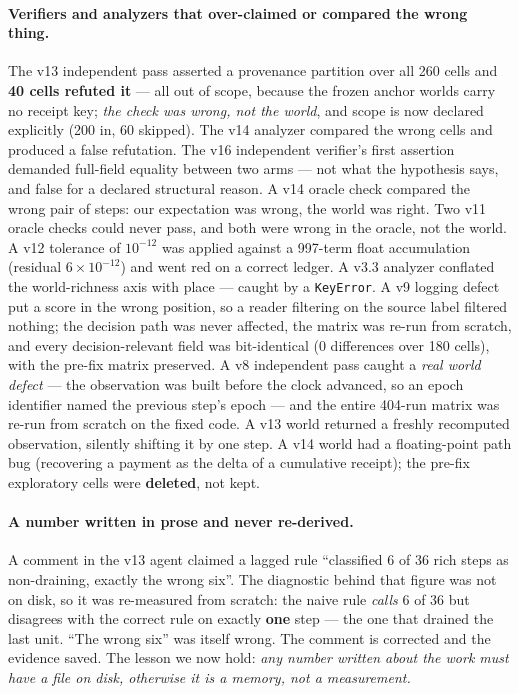 \documentclass[11pt]{article}
\newcommand{\code}[1]{\texttt{\small #1}}
\begin{document}
\paragraph{Verifiers and analyzers that over-claimed or compared the wrong thing.}
The v13 independent pass asserted a provenance partition over all 260 cells and
\textbf{40 cells refuted it} --- all out of scope, because the frozen anchor worlds
carry no receipt key; \emph{the check was wrong, not the world}, and scope is now
declared explicitly (200 in, 60 skipped). The v14 analyzer compared the wrong cells and
produced a false refutation. The v16 independent verifier's first assertion demanded
full-field equality between two arms --- not what the hypothesis says, and false for a
declared structural reason. A v14 oracle check compared the wrong pair of steps: our
expectation was wrong, the world was right. Two v11 oracle checks could never pass, and
both were wrong in the oracle, not the world. A v12 tolerance of $10^{-12}$ was applied
against a 997-term float accumulation (residual $6\times10^{-12}$) and went red on a
correct ledger. A v3.3 analyzer conflated the world-richness axis with place --- caught
by a \code{KeyError}. A v9 logging defect put a score in the wrong position, so a
reader filtering on the source label filtered nothing; the decision path was never
affected, the matrix was re-run from scratch, and every decision-relevant field was
bit-identical (0 differences over 180 cells), with the pre-fix matrix preserved. A v8
independent pass caught a \emph{real world defect} --- the observation was built before
the clock advanced, so an epoch identifier named the previous step's epoch --- and the
entire 404-run matrix was re-run from scratch on the fixed code. A v13 world returned a
freshly recomputed observation, silently shifting it by one step. A v14 world had a
floating-point path bug (recovering a payment as the delta of a cumulative receipt);
the pre-fix exploratory cells were \textbf{deleted}, not kept.

\paragraph{A number written in prose and never re-derived.} A comment in the v13
agent claimed a lagged rule ``classified 6 of 36 rich steps as non-draining, exactly
the wrong six''. The diagnostic behind that figure was not on disk, so it was
re-measured from scratch: the naive rule \emph{calls} 6 of 36 but disagrees with the
correct rule on exactly \textbf{one} step --- the one that drained the last unit. ``The
wrong six'' was itself wrong. The comment is corrected and the evidence saved. The
lesson we now hold: \emph{any number written about the work must have a file on disk,
otherwise it is a memory, not a measurement.}
\end{document}
